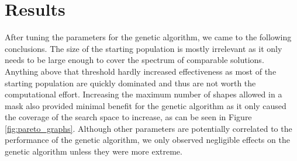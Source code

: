 \documentclass[conference]{IEEEtran}
\begin{document}
\section{Results}

After tuning the parameters for the genetic algorithm, we came to the following conclusions.
The size of the starting population is mostly irrelevant as it only needs to be large enough to cover the spectrum of comparable solutions. 
Anything above that threshold hardly increased effectiveness as most of the starting population are quickly dominated and thus are not worth the computational effort.
Increasing the maximum number of shapes allowed in a mask also provided minimal benefit for the genetic algorithm as it only caused the coverage of the search space to increase, as can be seen in Figure \ref{fig:pareto_graphs}.
Although other parameters are potentially correlated to the performance of the genetic algorithm, we only observed negligible effects on the genetic algorithm unless they were more extreme.
    
\end{document}
